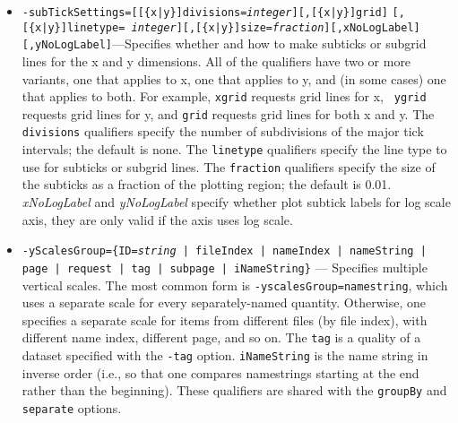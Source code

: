 \begin{itemize}
\begin{itemize}
\begin{itemize}
The {\tt factor} qualifiers specify factors to apply to the data values in producing the labels.  For example, one
might want to muliply small values by a power of ten in order to get labels that are of order units.  The {\tt
spacing} values give the spacing of the ticks and labels with any factor included.  I.e., to keep the same number
of ticks, {\tt factor} and {\tt spacing} values must be increased together.  Usually, giving the {\tt spacing}
qualifiers is unnecessary, since {\tt sddsplot} chooses appropriate values.

The {\tt modulus} qualifiers allow printing the modulus of the label value rather than the value itself; for
example, one might use {\tt xmodulus=24} if x was the time in hours over many days.  The {\tt size} qualifiers
permit specification of the size of the ticks as a fraction of the range in the opposing dimension; the default is
0.02.  The {\em linetype} qualifiers specify the linetype to be used for ticks and grid lines, using integer values
as for the {\tt -graph=line} switch.  The {\tt logarithmic} qualifiers specify log-style ticks and labels; the
implication is that the data being plotted is the base-ten logarithm of something.

  \item {\tt -subTickSettings=[[\{x|y\}]divisions={\em integer}][,[\{x|y\}]grid]} {\tt [,[\{x|y\}]linetype={\em
integer}][,[\{x|y\}]size={\em fraction}][,xNoLogLabel][,yNoLogLabel]}---Specifies whether and how to make subticks or subgrid lines for the
x and y dimensions.  All of the qualifiers have two or more variants, one that applies to x, one that applies
to y, and (in some cases) one that applies to both.  For example, {\tt xgrid} requests grid lines for x, {\tt
ygrid} requests grid lines for y, and {\tt grid} requests grid lines for both x and y.  The {\tt divisions}
qualifiers specify the number of subdivisions of the major tick intervals; the default is none.  The {\tt linetype}
qualifiers specify the line type to use for subticks or subgrid lines.  The {\tt fraction} qualifiers specify
the size of the subticks as a fraction of the plotting region; the default is 0.01. {\em xNoLogLabel} and {\em yNoLogLabel} specify whether plot subtick labels for log scale axis, they are only valid if the axis uses log scale.

  \item {\tt -yScalesGroup=\{ID={\em string} | fileIndex | nameIndex | nameString | page | request | tag | subpage | iNameString\}} --- 
        Specifies multiple vertical scales.  The most common form is {\tt -yscalesGroup=namestring}, which
        uses a separate scale for every separately-named quantity.  Otherwise, one specifies a separate
        scale for items from different files (by file index), with different name index, different page,
        and so on.  The \verb|tag| is a quality of a dataset specified with the \verb|-tag| option.
        \verb|iNameString| is the name string in inverse order (i.e., so that one compares namestrings
        starting at the end rather than the beginning).  These qualifiers are shared with the
        \verb|groupBy| and \verb|separate| options.
        

\end{itemize}
\end{itemize}
\end{itemize}
